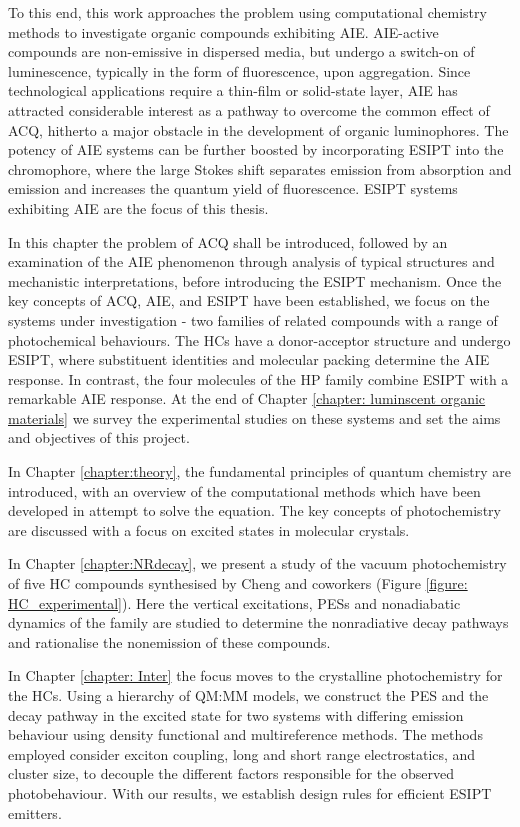 To this end, this work approaches the problem using computational chemistry methods to investigate organic compounds exhibiting \ac{AIE}. AIE-active compounds are non-emissive in dispersed media, but undergo a switch-on of luminescence, typically in the form of fluorescence, upon aggregation. Since technological applications require a thin-film or solid-state layer, AIE has attracted considerable interest as a pathway to overcome the common effect of \ac{ACQ}, hitherto a major obstacle in the development of organic luminophores. The potency of \ac{AIE} systems can be further boosted by incorporating \acf{ESIPT} into the chromophore, where the large Stokes shift separates emission from absorption and emission and increases the quantum yield of fluorescence. ESIPT systems exhibiting AIE are the focus of this thesis. 

In this chapter the problem of \ac{ACQ} shall be introduced, followed by an examination of the \ac{AIE} phenomenon through analysis of typical structures and mechanistic interpretations, before introducing the \ac{ESIPT} mechanism. Once the key concepts of \ac{ACQ}, \ac{AIE}, and \ac{ESIPT} have been established, we focus on the systems under investigation - two families of related compounds with a range of photochemical behaviours. The \acp{HC} have a donor-acceptor structure and undergo \ac{ESIPT}, where substituent identities and molecular packing determine the AIE response. In contrast, the four molecules of the \ac{HP} family combine \ac{ESIPT} with a remarkable \ac{AIE} response. At the end of Chapter \ref{chapter: luminscent organic materials} we survey the experimental studies on these systems and set the aims and objectives of this project. 

In Chapter \ref{chapter:theory}, the fundamental principles of quantum chemistry are introduced, with an overview of the computational methods which have been developed in attempt to solve the \schro{} equation. The key concepts of photochemistry are discussed with a focus on excited states in molecular crystals.

In Chapter \ref{chapter:NRdecay}, we present a study of the vacuum photochemistry of five \ac{HC} compounds synthesised by Cheng and coworkers (Figure \ref{figure: HC_experimental}). Here the vertical excitations, \acp{PES} and nonadiabatic dynamics of the family are studied to determine the nonradiative decay pathways and rationalise the nonemission of these compounds.

In Chapter \ref{chapter: Inter} the focus moves to the crystalline photochemistry for the \acp{HC}. Using a hierarchy of QM:MM models, we construct the \ac{PES} and the decay pathway in the excited state for two systems with differing emission behaviour using density functional and multireference methods. The methods employed consider exciton coupling, long and short range electrostatics, and cluster size, to decouple the different factors responsible for the observed photobehaviour. With our results, we establish design rules for efficient ESIPT emitters.

